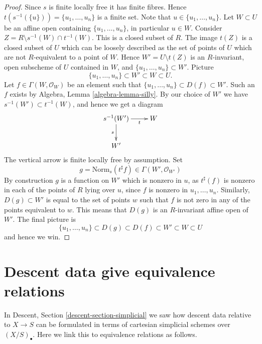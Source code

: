 \begin{proof}
Since $s$ is finite locally free it has finite fibres. Hence
$t(s^{-1}(\{u\})) = \{u_1, \ldots, u_n\}$ is a finite set.
Note that $u \in \{u_1, \ldots, u_n\}$.
Let $W \subset U$ be an affine open containing $\{u_1, \ldots, u_n\}$,
in particular $u \in W$. Consider
$Z = R \setminus s^{-1}(W) \cap t^{-1}(W)$. This is a closed subset
of $R$. The image $t(Z)$ is a closed subset of $U$ which can be loosely
described as the set of points of $U$ which are not $R$-equivalent to a
point of $W$. Hence $W' = U \setminus t(Z)$ is an $R$-invariant, open
subscheme of $U$ contained in $W$, and $\{u_1, \ldots, u_n\} \subset W'$.
Picture
$$
\{u_1, \ldots, u_n\} \subset W' \subset W \subset U.
$$
Let $f \in \Gamma(W, \mathcal{O}_W)$ be an element such that
$\{u_1, \ldots, u_n\} \subset D(f) \subset W'$. Such an $f$ exists by
Algebra, Lemma \ref{algebra-lemma-silly}. By our choice of $W'$ we
have $s^{-1}(W') \subset t^{-1}(W)$, and hence we get a diagram
$$
\xymatrix{
s^{-1}(W') \ar[d]_s \ar[r]_-t & W \\
W'
}
$$
The vertical arrow is finite locally free by assumption. Set
$$
g = \text{Norm}_s(t^\sharp f) \in \Gamma(W', \mathcal{O}_{W'})
$$
By construction $g$ is a function on $W'$ which is
nonzero in $u$, as $t^\sharp(f)$ is nonzero in each of the points of
$R$ lying over $u$, since $f$ is nonzero in $u_1, \ldots, u_n$.
Similarly, $D(g) \subset W'$ is equal to the
set of points $w$ such that $f$ is not zero in any of the points
equivalent to $w$. This means that $D(g)$ is an
$R$-invariant affine open of $W'$. The final picture is
$$
\{u_1, \ldots, u_n\} \subset D(g) \subset D(f) \subset W' \subset W \subset U
$$
and hence we win.
\end{proof}















\section{Descent data give equivalence relations}
\label{section-equivalence-relation}

\noindent
In Descent, Section \ref{descent-section-simplicial} we saw how descent
data relative to $X \to S$ can be formulated in terms of cartesian simplicial
schemes over $(X/S)_\bullet$. Here we link this to equivalence
relations as follows.

